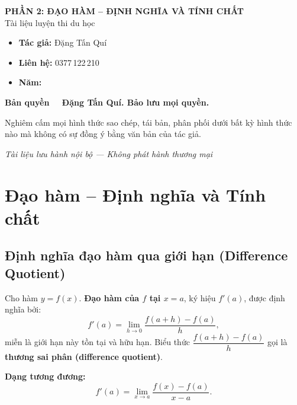 \documentclass[12pt,a4paper]{article}
\begin{document}
\newpage

\thispagestyle{empty}
\vspace*{5cm}
\begin{center}
  {\Large\bfseries PHẦN 2: ĐẠO HÀM -- ĐỊNH NGHĨA VÀ TÍNH CHẤT}\\[8pt]
  {\large Tài liệu luyện thi du học}
\end{center}
\vspace{2cm}
\begin{tcolorbox}[enhanced, colback=red!3!white, colframe=red!60!black, fonttitle=\bfseries, title={Thông tin bản quyền}, boxrule=1.5pt]
  \begin{itemize}[leftmargin=*]
    \item \textbf{Tác giả:} Đặng Tấn Quí
    \item \textbf{Liên hệ:} 0377\,122\,210
    \item \textbf{Năm:} \the\year
  \end{itemize}
  \vspace{8pt}
  \textbf{Bản quyền \textcopyright\ \the\year\ Đặng Tấn Quí. Bảo lưu mọi quyền.}

  \vspace{6pt}
  Nghiêm cấm mọi hình thức sao chép, tái bản, phân phối dưới bất kỳ hình thức nào mà không có sự đồng ý bằng văn bản của tác giả.
\end{tcolorbox}
\vfill
\begin{center}
  \small\textit{Tài liệu lưu hành nội bộ --- Không phát hành thương mại}
\end{center}

\newpage
\tableofcontents
\newpage

\section{Đạo hàm -- Định nghĩa và Tính chất}

\subsection{Định nghĩa đạo hàm qua giới hạn (Difference Quotient)}

\begin{dinhnghia}[title={Đạo hàm tại một điểm}]
  Cho hàm $y = f(x)$. \textbf{Đạo hàm của $f$ tại $x = a$}, ký hiệu $f'(a)$, được định nghĩa bởi:
  \[
    f'(a) = \lim_{h \to 0} \dfrac{f(a + h) - f(a)}{h},
  \]
  miễn là giới hạn này tồn tại và hữu hạn. Biểu thức $\dfrac{f(a+h) - f(a)}{h}$ gọi là \textbf{thương sai phân (difference quotient)}.

  \medskip
  \textbf{Dạng tương đương:}
  \[
    f'(a) = \lim_{x \to a} \dfrac{f(x) - f(a)}{x - a}.
  \]
\end{dinhnghia}
\end{document}
